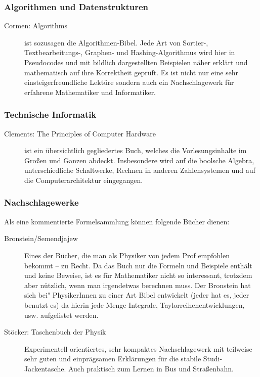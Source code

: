 \subsubsection*{Algorithmen und Datenstrukturen}
\begin{description}

\item[Cormen: Algorithms]{
	ist sozusagen die Algorithmen-Bibel. Jede Art von Sortier-, Textbearbeitungs-,
Graphen- und Hashing-Algorithmus wird hier in Pseudocodes und mit bildlich dargestellten
Beispielen näher erklärt und mathematisch auf ihre Korrektheit geprüft. Es ist nicht nur eine sehr
einsteigerfreundliche Lektüre sondern auch ein Nachschlagewerk für erfahrene Mathematiker und
Informatiker.}
\end{description}

\subsubsection*{Technische Informatik}
\begin{description}
\item[Clements: The Principles of Computer Hardware]{
	ist ein übersichtlich gegliedertes
Buch, welches die Vorlesungsinhalte im Großen und Ganzen abdeckt.
Insbesondere wird auf die boolsche Algebra, unterschiedliche Schaltwerke,
Rechnen in anderen Zahlensystemen und auf die Computerarchitektur
eingegangen.}
\end{description}

\subsubsection*{Nachschlagewerke}

Als eine kommentierte Formelsammlung können folgende Bücher dienen:

\begin{description}
\item[Bronstein/Semendjajew]{
		Eines der Bücher, die man als Physiker von jedem Prof empfohlen bekommt -- zu Recht. Da das Buch nur die Formeln und Beispiele enthält und keine Beweise, ist es für Mathematiker nicht so interessant, trotzdem aber nützlich, wenn man irgendetwas berechnen muss. Der Bronstein hat sich bei" PhysikerInnen zu einer Art Bibel entwickelt (jeder hat es, jeder benutzt es) da hierin jede Menge Integrale, Taylorreihenentwicklungen, usw. aufgelistet werden.}

\item[Stöcker: Taschenbuch der Physik]{
		Experimentell orientiertes, sehr kompaktes Nachschlagewerk mit teilweise sehr guten und einprägsamen Erklärungen für die stabile Studi- Jackentasche. Auch praktisch zum Lernen in Bus und Straßenbahn.}
\end{description}
